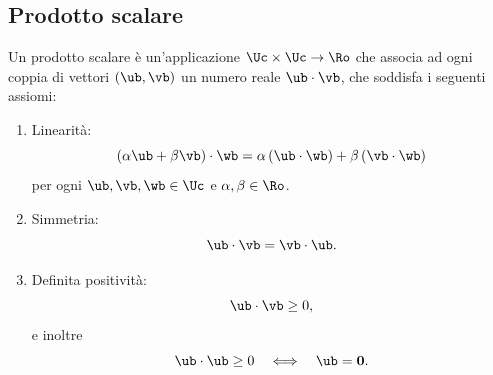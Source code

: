 


%
%


\subsection{Prodotto scalare}
Un prodotto scalare è un'applicazione $\Uc\times\Uc \to \Ro$ che associa ad ogni coppia di vettori $(\ub, \vb)$ un numero reale $\ub\cdot\vb$, che soddisfa i seguenti assiomi:
\begin{enumerate}
	\item Linearità:
	\begin{equation}
	(\alpha \ub+\beta \vb)\cdot \wb=\alpha\,(\ub\cdot\wb)+\beta\, (\vb\cdot \wb)
	\end{equation}
per ogni $\ub, \vb, \wb \in\Uc$ e $\alpha, \beta\in \Ro$.
\item Simmetria:
\begin{equation}
	\ub\cdot \vb=\vb\cdot \ub.
\end{equation}
\item Definita positività:
\begin{equation}
	\ub\cdot\vb\geq0,
\end{equation}
e inoltre
\begin{equation}
	\ub\cdot\ub\geq0 \quad \Longleftrightarrow \quad \ub=\mathbf{0}.
\end{equation}
\end{enumerate}


